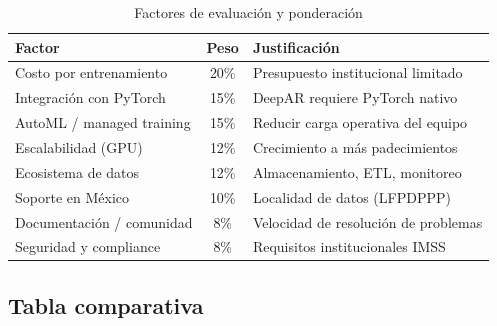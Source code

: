 \documentclass[12pt, letterpaper]{article}
\begin{document}
\begin{table}[H]
\centering
\caption{Factores de evaluación y ponderación}
\label{tab:factores_cloud}
\small
\begin{tabularx}{\textwidth}{l c X}
\toprule
\textbf{Factor} & \textbf{Peso} & \textbf{Justificación} \\
\midrule
Costo por entrenamiento     & 20\% & Presupuesto institucional limitado \\
Integración con PyTorch     & 15\% & DeepAR requiere PyTorch nativo \\
AutoML / managed training   & 15\% & Reducir carga operativa del equipo \\
Escalabilidad (GPU)         & 12\% & Crecimiento a más padecimientos \\
Ecosistema de datos         & 12\% & Almacenamiento, ETL, monitoreo \\
Soporte en México           & 10\% & Localidad de datos (LFPDPPP) \\
Documentación / comunidad   & 8\%  & Velocidad de resolución de problemas \\
Seguridad y compliance      & 8\%  & Requisitos institucionales IMSS \\
\bottomrule
\end{tabularx}
\end{table}

\subsection{Tabla comparativa}
\end{document}
